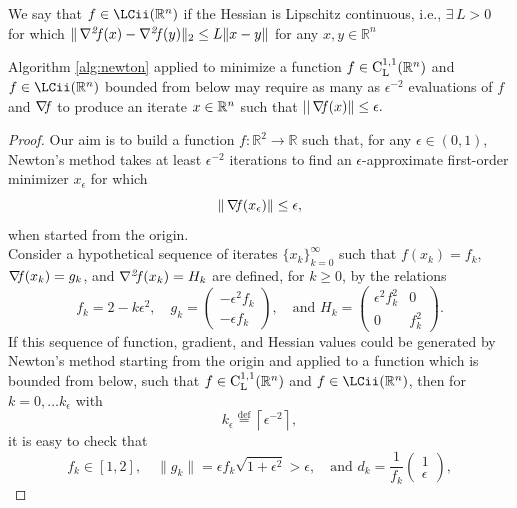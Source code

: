 \documentclass[10pt,a4paper]{article}
\begin{document}
\begin{definition}
	We say that $f\in \LCii(\Rn)$ if the Hessian is Lipschitz continuous, i.e., $ \exists\, L > 0$ for which $\|\operatorname*{\mathit{\nabla^2 \!f}}(x) - \operatorname*{\mathit{\nabla^2 \!f}}(y)\|_2 \leq L\|x - y\|$ for any $x, y \in \mathbb{R}^n$
\end{definition}
\begin{theorem}\label{thm:slow_newton}
	Algorithm \ref{alg:newton} applied to minimize a function $f\in \mathord{\mathrm{C^{1,1}_{L}}}(\mathbb{R}^n)$ and $f\in \LCii(\Rn)$ bounded from below may require as many as $\epsilon^{-2}$ evaluations of $f$ and $\operatorname*{\mathit{\nabla \!f}}$ to produce an iterate $x\in \mathbb{R}^n$ such that $||\operatorname*{\mathit{\nabla \!f}} (x)\|\leq \epsilon.$
\end{theorem}
\begin{proof}
	Our aim is to build a function $f : \mathbb{R}^2 \to \mathbb{R}$ such that, for any $\epsilon \in (0,1)$, Newton's method takes at least $\epsilon^{-2}$ iterations to find an $\epsilon$-approximate first-order minimizer $x_\epsilon$ for which
	\begin{equation*}
		\|\operatorname*{\mathit{\nabla \!f}}(x_\epsilon)\| \leq \epsilon,
	\end{equation*}
	when started from the origin.\\
	Consider a hypothetical sequence of iterates $\{x_k\}_{k=0}^\infty$ such that $f(x_k) = f_k$, $\operatorname*{\mathit{\nabla \!f}}(x_k) = g_k$, and $\operatorname*{\mathit{\nabla^2 \!f}}(x_k) = H_k$ are defined, for $k \geq 0$, by the relations
	\begin{equation}\label{eq:def_fk}
		f_k = 2 - k\epsilon^2, \quad g_k = \begin{pmatrix} -\epsilon^2 f_k \\ -\epsilon f_k \end{pmatrix}, \quad \text{and } H_k = \begin{pmatrix} \epsilon^2 f_k^2 & 0 \\ 0 & f_k^2 \end{pmatrix}.
	\end{equation}
	If this sequence of function, gradient, and Hessian values could be generated by Newton's method starting from the origin and applied to a function which is bounded from below, such that $f\in \mathord{\mathrm{C^{1,1}_{L}}}(\mathbb{R}^n)$ and $f\in \LCii(\Rn)$, then for $k=0,\dots k_\epsilon$ with
	\begin{equation*}
		k_\epsilon \stackrel{\text{def}}{=} \left\lceil \epsilon^{-2} \right\rceil,
	\end{equation*}
	it is easy to check that
	\begin{equation*}
		f_k \in [1,2], \quad \|g_k\| = \epsilon f_k \sqrt{1 + \epsilon^2} > \epsilon, \quad \text{and } d_k = \frac{1}{f_k} \begin{pmatrix} 1 \\ \epsilon \end{pmatrix},

\end{equation*}
\end{proof}
\end{document}
